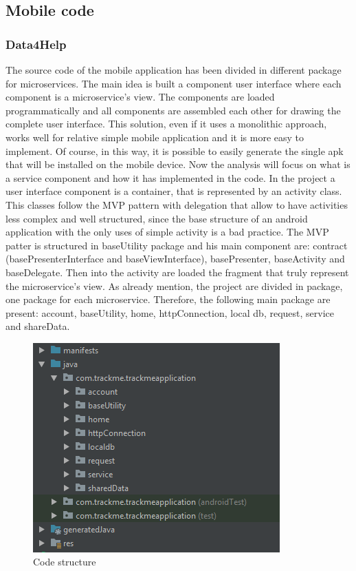 \subsection{Mobile code}

\subsubsection{Data4Help}
The source code of the mobile application has been divided in different package for microservices. The main idea is built a component user interface where each component is a microservice's view. The components are loaded programmatically and all components are assembled each other for drawing the complete user interface. This solution, even if it uses a monolithic approach, works well for relative simple mobile application and it is more easy to implement. Of course, in this way, it is possible to easily generate the single apk that will be installed on the mobile device. Now the analysis will focus on what is a service component and how it has implemented in the code. In the project a user interface component is a container, that is represented by an activity class. This classes follow the MVP pattern with delegation that allow to have activities less complex and well structured, since the base structure of an android application with the only uses of simple activity is a bad practice. The MVP patter is structured in baseUtility package and his main component are: contract (basePresenterInterface and baseViewInterface), basePresenter, baseActivity and baseDelegate. Then into the activity are loaded the fragment that truly represent the microservice's view. As already mention, the project are divided in package, one package for each microservice. Therefore, the following main package are present: account, baseUtility, home, httpConnection, local db, request, service and shareData. 

\begin{figure}[H]
\includegraphics[width=\linewidth]{images/ProjectStructure.png}
\caption{ Code structure}
\label{fig:pkgsharedata}
\end{figure}

